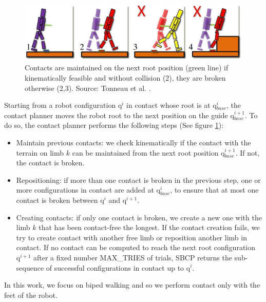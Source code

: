 \begin{figure}
    \centering
    \includegraphics[width=\textwidth]{Figures/Chapter_CPSB/contact_maintain.png}
    \caption{Contacts are maintained on the next root position (green line) if kinematically feasible and without collision (2), they are broken otherwise (2,3). Source: Tonneau et al. \cite{AcyclicCP}.}
    \label{fig:overview_sbcp}
\end{figure}

Starting from a robot configuration $\mbox{q}^i$ in contact whose root is at q$_{base}^i$, the contact planner moves the robot root to the next position on the guide q$_{base}^{i+1}$. To do so, the contact planner performs the following steps (See figure \ref{fig:overview_sbcp}):
\begin{itemize}
    \item Maintain previous contacts: we check kinematically if the contact with the terrain on limb $k$ can be maintained from the next root position q$_{base}^{i+1}$. If not, the contact is broken.
    \item Repositioning: if more than one contact is broken in the previous step, one or more configurations in contact are added at q$_{base}^i$, to ensure that at most one contact is broken between $\mbox{q}^i$ and $\mbox{q}^{i+1}$. 
    \item Creating contacts: if only one contact is broken, we create a new one with the limb $k$ that has been contact-free the longest. If the contact creation fails, we try to create contact with another free limb or reposition another limb in contact. If no contact can be computed to reach the next root configuration $\mbox{q}^{i+1}$ after a fixed number MAX\_TRIES of trials, SBCP returns the sub-sequence of successful configurations in contact up to $\mbox{q}^i$.
\end{itemize}
In this work, we focus on biped walking and so we perform contact only with the feet of the robot.
